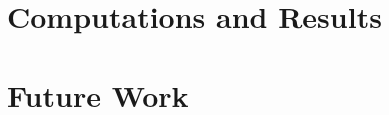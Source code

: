 \section{Computations and Results}\label{sec:kp-computations-and-results}

\section{Future Work}\label{sec:kp-future-work}
